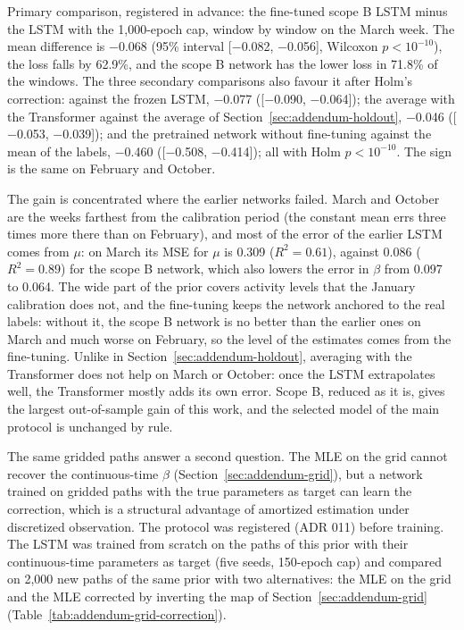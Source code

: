 Primary comparison, registered in advance: the fine-tuned scope B LSTM minus the LSTM with the
1,000-epoch cap, window by window on the March week. The mean difference is
$-$0.068 (95\% interval [$-$0.082, $-$0.056], Wilcoxon
$p<10^{-10}$), the loss falls by
62.9\%, and the scope B network has the
lower loss in 71.8\% of the windows. The three secondary comparisons
also favour it after Holm's correction: against the frozen LSTM,
$-$0.077 ([$-$0.090, $-$0.064]); the average with the
Transformer against the average of Section~\ref{sec:addendum-holdout},
$-$0.046 ([$-$0.053, $-$0.039]); and the pretrained network without
fine-tuning against the mean of the labels, $-$0.460
([$-$0.508, $-$0.414]); all with Holm $p<10^{-10}$. The sign is
the same on February and October.

The gain is concentrated where the earlier networks failed. March and October are the weeks
farthest from the calibration period (the constant mean errs three times more there than on
February), and most of the error of the earlier LSTM comes from $\mu$: on March its MSE for
$\mu$ is 0.309 ($R^2=0.61$),
against 0.086 ($R^2=0.89$) for the
scope B network, which also lowers the error in $\beta$ from
0.097 to 0.064.
The wide part of the prior covers activity levels that the January calibration does not, and
the fine-tuning keeps the network anchored to the real labels: without it, the scope B
network is no better than the earlier ones on March and much worse on February, so the
level of the estimates comes from the fine-tuning. Unlike in
Section~\ref{sec:addendum-holdout}, averaging with the Transformer does not help on March
or October: once the LSTM extrapolates well, the Transformer mostly adds its own error. Scope B,
reduced as it is, gives the largest out-of-sample gain of this work, and the selected model of
the main protocol is unchanged by rule.


\label{sec:addendum-grid-correction}

The same gridded paths answer a second question. The MLE on the grid cannot recover the
continuous-time $\beta$
(Section~\ref{sec:addendum-grid}), but a network trained on gridded paths with the true
parameters as target can learn the correction, which is a structural advantage of amortized
estimation under discretized observation. The protocol was registered (ADR 011) before
training. The LSTM was trained from scratch on the paths of this prior with their continuous-time parameters as target (five
seeds, 150-epoch cap) and compared on 2,000 new paths of the same prior
with two alternatives: the MLE on the grid and the MLE corrected by inverting the map of
Section~\ref{sec:addendum-grid} (Table~\ref{tab:addendum-grid-correction}).

